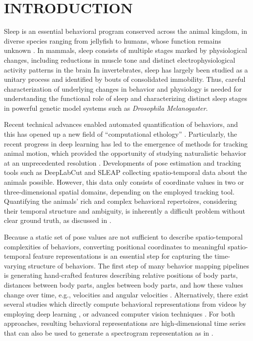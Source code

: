 \setlength{\parindent}{0pt}
\chapter{\bf INTRODUCTION}\label{chapter:introduction}
Sleep is an essential behavioral program conserved across the animal kingdom, in diverse species ranging from jellyfish to humans, whose function remains unknown \citep{campbell_animal_1984, nath_jellyfish_2017}.
In mammals, sleep consists of multiple stages marked by physiological changes, including reductions in muscle tone and distinct electrophysiological activity patterns in the brain \citep{corner_sleep_1977, sauer_dynamics_2003} In invertebrates, sleep has largely been studied as a unitary process and identified by bouts of consolidated immobility.
Thus, careful characterization of underlying changes in behavior and physiology is needed for understanding the functional role of sleep and characterizing distinct sleep stages in powerful genetic model systems such as \textit{Drosophila Melanogaster}.

Recent technical advances enabled automated quantification of behaviors, and this has opened up a new field of ``computational ethology'' \citep{anderson_toward_2014, datta_computational_2019}.
Particularly, the recent progress in deep learning has led to the emergence of  methods for tracking animal motion, which provided the opportunity of studying naturalistic behavior at an unprecedented resolution \citep{pereira_quantifying_2020}.
Developments of pose estimation and tracking tools such as DeepLabCut \citep{mathis_deeplabcut_2018} and SLEAP \citep{pereira_fast_2019, pereira_sleap_2022} collecting spatio-temporal data about the animals possible.
However, this data only consists of coordinate values in two or three-dimensional spatial domains, depending on the employed tracking tool.
Quantifying the animals' rich and complex behavioral repertoires, considering their temporal structure and ambiguity, is inherently a difficult problem without clear ground truth, as discussed in \citet{pereira_quantifying_2020}.

Because a static set of pose values are not sufficient to describe spatio-temporal complexities of behaviors, converting positional coordinates to meaningful spatio-temporal feature representations is an essential step for capturing the time-varying structure of behaviors.
The first step of many behavior mapping pipelines is generating hand-crafted features describing relative positions of body parts, distances between body parts, angles between body parts, and how these values change over time, e.g., velocities and angular velocities \citep{kabra_jaaba_2013, hsu_b-soid_2021, marshall_continuous_2021, nilsson_simple_2020}.
Alternatively, there exist several studies which directly compute behavioral representations from videos by employing deep learning \citep{bohnslav_deepethogram_2021}, or advanced computer vision techniques \citep{berman_mapping_2014, wiltschko_mapping_2015}.
For both approaches, resulting behavioral representations are high-dimensional time series that can also be used to generate a spectrogram representation as in \citet{berman_mapping_2014, todd_systematic_2017, marshall_continuous_2021}.

